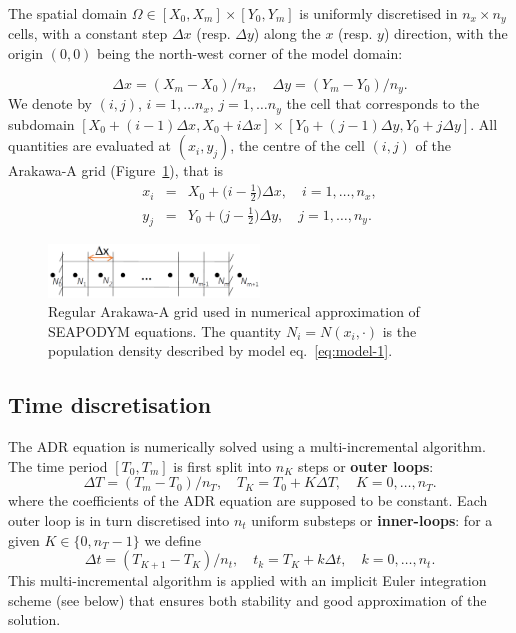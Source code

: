 The spatial domain $\Omega\in[X_0,X_m]\times[Y_0,Y_m]$ 
is uniformly discretised in $n_x\times n_y$ cells, 
with a constant step $\Delta x$ (resp. $\Delta y$) along the $x$ (resp. $y$) direction, with the origin $(0,0)$ being the north-west corner of the model domain:

\begin{equation}
  \label{eq:delta-xy}
  \Delta x = (X_m-X_0) / n_x,
  \quad   
  \Delta y = (Y_m-Y_0) / n_y.
\end{equation}
We denote by $(i,j)$, $i=1,\dots n_x$, $j=1,\dots n_y$ the cell that
corresponds to the subdomain 
$[X_0+(i-1)\Delta x,X_0+i\Delta x] \times [Y_0+(j-1)\Delta
  y,Y_0+j\Delta y]$.
All quantities are evaluated at $(x_i,y_j)$, the centre of the cell
$(i,j)$ of the Arakawa-A grid (Figure~\ref{fig:Arakawa-A}), that is
\begin{eqnarray}
  \label{eq:xi}
  x_i &=& X_0+\Big(i-\frac{1}{2}\Big)\Delta x,\quad i=1,\dots, n_x,\\
  \label{eq:yj}
  y_j &=& Y_0+\Big(j-\frac{1}{2}\Big)\Delta y,\quad j=1,\dots, n_y.
\end{eqnarray}


\begin{figure}
   \centering
    \vbox{
    \includegraphics[width=0.5\textwidth]{chapter2/figs/Arakawa-A}
   }
   \caption{Regular Arakawa-A grid used in numerical approximation of SEAPODYM equations. The quantity $N_i=N(x_i,\cdot)$ is the population density described by model eq.~\eqref{eq:model-1}. }
   \label{fig:Arakawa-A}
 \end{figure}

\subsection{Time discretisation}
\label{sec:d-time}

The ADR equation is numerically solved using a multi-incremental algorithm.
The time period $[T_0,T_m]$ is first split into $n_K$ steps or \textbf{outer loops}:
\begin{equation}
  \label{eq:delta-T}
  \Delta T=(T_m-T_0)/n_T,\quad T_K=T_0+K\Delta T,\quad K=0,\dots,n_T.
\end{equation}
where the coefficients of the ADR equation are supposed to be constant. 
Each outer loop is in turn discretised into $n_t$ uniform substeps or \textbf{inner-loops}: 
for a given $K\in\{0,n_T-1\}$ we define
\begin{equation}
  \label{eq:delta-t}
  \Delta t=(T_{K+1}-T_{K})/n_t,\quad t_k=T_{K}+k\Delta t,\quad k=0,\dots,n_t.
\end{equation}
This multi-incremental algorithm is applied with an implicit Euler integration scheme (see below) 
that ensures both stability and good approximation of the solution. 


